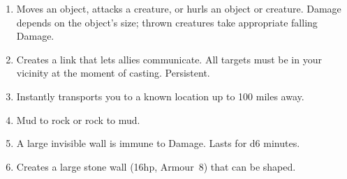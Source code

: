 \documentclass[itdr/core]{subfiles}
\begin{document}
\begin{enumerate}
	\item {} Moves an object, attacks a creature, or hurls an object or creature. Damage \mbox{depends} on the object's size; thrown creatures take appropriate falling Damage.
	\item {} Creates a link that lets allies communicate. All targets must be in your vicinity at the moment of casting. \mbox{Persistent.}
	\item {} Instantly transports you to a known location up to 100 miles away.
	\item {} Mud to rock or rock to mud.
	\item {} A large invisible wall is immune to Damage. Lasts for d6 minutes.
	\item {} Creates a large stone wall (16hp, Armour~8) that can be shaped.
\end{enumerate}

\vfill
\break
\end{document}
